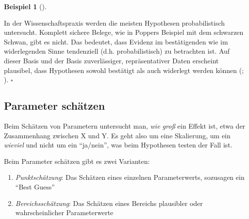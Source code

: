 \documentclass[
  ngerman,
  letterpaper,
  twoside,
  open=any]{scrbook}
\theoremstyle{definition}
\newtheorem{example}{Beispiel}[chapter]
\theoremstyle{plain}
\theoremstyle{definition}
\theoremstyle{definition}
\theoremstyle{remark}
\begin{document}
\begin{example}[]
\begin{tcolorbox}
\end{tcolorbox}


\begin{tcolorbox}[enhanced jigsaw, arc=.35mm, bottomrule=.15mm, bottomtitle=1mm, breakable, colback=white, colbacktitle=quarto-callout-note-color!10!white, colframe=quarto-callout-note-color-frame, coltitle=black, left=2mm, leftrule=.75mm, opacityback=0, opacitybacktitle=0.6, rightrule=.15mm, title=\textcolor{quarto-callout-note-color}{\faInfo}\hspace{0.5em}{Wirklich nicht?}, titlerule=0mm, toprule=.15mm, toptitle=1mm]

In der Wissenschaftspraxis werden die meisten Hypothesen probabilistisch
untersucht. Komplett sichere Belege, wie in Poppers Beispiel mit dem
schwarzen Schwan, gibt es nicht. Das bedeutet, dass Evidenz im
bestätigenden wie im widerlegenden Sinne tendenziell (d.h.
probabilistisch) zu betrachten ist. Auf dieser Basis und der Basis
zuverlässiger, repräsentativer Daten erscheint plausibel, dass
Hypothesen sowohl bestätigt als auch widerlegt werden können
(;
). \(\square\)

\end{tcolorbox}

\subsection{Parameter schätzen}\label{parameter-schuxe4tzen}

Beim Schätzen von Parametern untersucht man, \emph{wie groß} ein Effekt
ist, etwa der Zusammenhang zwischen X und Y. Es geht also um eine
Skalierung, um ein \emph{wieviel} und nicht um ein \enquote{ja/nein},
was beim Hypothesen testen der Fall ist.

Beim Parameter schätzen gibt es zwei Varianten:

\begin{enumerate}
\def\labelenumi{\alph{enumi})}
\item
  \emph{Punktschätzung}: Das Schätzen eines einzelnen Parameterwerts,
  sozusagen ein \enquote{Best Guess}
\item
  \emph{Bereichsschätzung}: Das Schätzen eines Bereichs plausibler oder
  wahrscheinlicher Parameterwerte
\end{enumerate}


\end{example}
\end{document}
